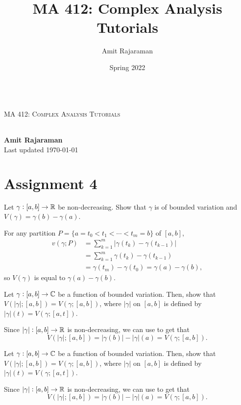 \documentclass{article}
\title{MA 412: Complex Analysis Tutorials}
\author{Amit Rajaraman}
\date{Spring 2022}
\newcommand*{\titleBC}{\begingroup %
    \centering %
    
    \def\CP{\Huge \scshape MA 412: Complex Analysis Tutorials} %
    
    \settowidth{\unitlength}{\CP} %
    \HRule{0.5pt} \\[0.6cm]
    {\CP} \\[\baselineskip] %
    \HRule{0.5pt} \\[0.5cm]
    \vspace{0.5cm}
    
    {\Large\textbf{Amit Rajaraman}}\\ %
    
    \vspace{0.4cm}
    Last updated \today %

\endgroup}
\begin{document}
\thispagestyle{empty}
\titleBC

\tableofcontents
\clearpage
\setcounter{section}{3}


\section{Assignment 4}

\begin{exercise}
    \label{ex:4.1}
    Let $\gamma : [a,b] \to \mathbb{R}$ be non-decreasing. Show that $\gamma$ is of bounded variation and $V(\gamma) = \gamma(b) - \gamma(a)$.
\end{exercise}
\begin{solution*}
    For any partition $P = \{ a = t_0 < t_1 < \cdots < t_m = b \}$ of $[a,b]$,
    \begin{align*}
        v(\gamma;P) &= \sum_{k=1}^{m} |\gamma(t_k) - \gamma(t_{k-1})| \\
            &= \sum_{k=1}^{m} \gamma(t_k) - \gamma(t_{k-1}) \\
            &= \gamma(t_m) - \gamma(t_0) = \gamma(a) - \gamma(b),
    \end{align*}
    so $V(\gamma)$ is equal to $\gamma(a) - \gamma(b)$.
\end{solution*}

\begin{exercise}
    Let $\gamma : [a,b] \to \mathbb{C}$ be a function of bounded variation. Then, show that $V(|\gamma|;[a,b]) = V(\gamma;[a,b])$, where $|\gamma|$ on $[a,b]$ is defined by $|\gamma|(t) = V(\gamma;[a,t])$.
\end{exercise}
\begin{solution*}
    Since $|\gamma| : [a,b] \to \mathbb{R}$ is non-decreasing, we can use  to get that
    \[ V(|\gamma|;[a,b]) = |\gamma(b)| - |\gamma|(a) = V(\gamma;[a,b]). \]
\end{solution*}

\begin{exercise}
    Let $\gamma : [a,b] \to \mathbb{C}$ be a function of bounded variation. Then, show that $V(|\gamma|;[a,b]) = V(\gamma;[a,b])$, where $|\gamma|$ on $[a,b]$ is defined by $|\gamma|(t) = V(\gamma;[a,t])$.
\end{exercise}
\begin{solution*}
    Since $|\gamma| : [a,b] \to \mathbb{R}$ is non-decreasing, we can use  to get that
    \[ V(|\gamma|;[a,b]) = |\gamma(b)| - |\gamma|(a) = V(\gamma;[a,b]). \]
\end{solution*}
\end{document}
